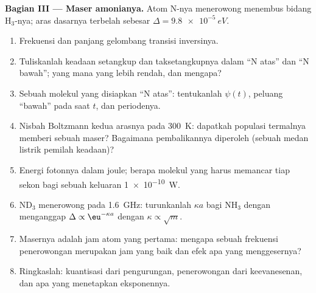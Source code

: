 \begin{problem}
\textbf{Bagian III --- Maser amonianya.}
Atom N-nya menerowong menembus bidang H$_3$-nya; aras dasarnya terbelah
sebesar $\Delta = \qty{9.8e-5}{eV}$.
\begin{enumerate}[resume]
  \item Frekuensi dan panjang gelombang transisi inversinya.
  \item Tuliskanlah keadaan setangkup dan taksetangkupnya dalam
        ``N atas'' dan ``N bawah''; yang mana yang lebih rendah, dan mengapa?
  \item Sebuah molekul yang disiapkan ``N atas'': tentukanlah $\psi(t)$, peluang
        ``bawah'' pada saat $t$, dan periodenya.
  \item Nisbah Boltzmann kedua arasnya pada \qty{300}{K}: dapatkah
        populasi termalnya memberi sebuah maser? Bagaimana pembalikannya diperoleh
        (sebuah medan listrik pemilah keadaan)?
  \item Energi fotonnya dalam joule; berapa molekul yang harus memancar
        tiap sekon bagi sebuah keluaran \qty{1e-10}{W}.
  \item ND$_3$ menerowong pada \qty{1.6}{GHz}: turunkanlah $\kappa a$ bagi NH$_3$
        dengan menganggap $\Delta \propto \eu^{-\kappa a}$ dengan $\kappa \propto \sqrt{m}$.
  \item Masernya adalah jam atom yang pertama: mengapa sebuah frekuensi
        penerowongan merupakan jam yang baik dan efek apa yang menggesernya?
  \item Ringkaslah: kuantisasi dari pengurungan, penerowongan dari
        keevanesenan, dan apa yang menetapkan eksponennya.
\end{enumerate}
\end{problem}
